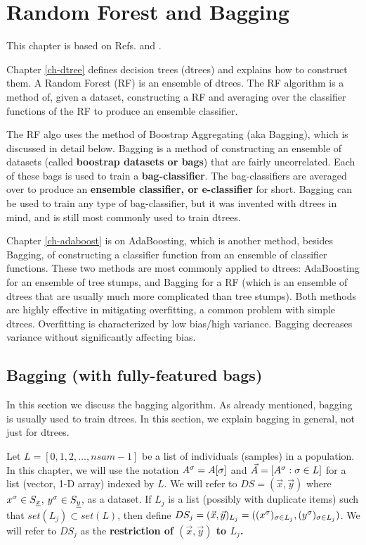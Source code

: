 \chapter{Random Forest and Bagging}
\label{ch-rforest}


This chapter
is based on Refs.\cite{wiki-bagging}
and \cite{wiki-rforest}.

Chapter \ref{ch-dtree}
defines decision trees (dtrees)
and explains how to construct them.
A Random Forest (RF) is 
an ensemble
of dtrees.
The RF algorithm is a
method of,
given a dataset,
constructing a RF
and averaging
over the classifier 
functions of the RF
to produce
an ensemble classifier.


The RF algo
uses  the method of 
Boostrap Aggregating
(aka Bagging), which 
is discussed in detail below.
Bagging
is a method
of constructing
an ensemble
of datasets (called {\bf boostrap
datasets or bags})
that are 
fairly uncorrelated.
Each of
these bags is used to
train a {\bf bag-classifier}.
The bag-classifiers
are averaged over
to produce an {\bf
ensemble classifier,
or e-classifier} for short.
Bagging can be used
to
train any type
of bag-classifier,
but it was 
invented with
dtrees
in mind, 
and is still
 most commonly
used to train dtrees.

Chapter \ref{ch-adaboost}
is on AdaBoosting,
which is 
another method,
besides Bagging,
of constructing a classifier function
from an ensemble 
of classifier functions.
These two methods are most commonly
applied to dtrees: AdaBoosting for an ensemble of
tree stumps, and Bagging for a 
RF (which
is an ensemble
of dtrees that are 
usually much more
complicated than tree stumps).
 Both methods 
 are highly effective
in mitigating overfitting,
a common problem with simple
dtrees.
Overfitting
is characterized by 
low bias/high variance.
Bagging decreases variance
without
significantly
affecting bias.



\section{Bagging (with fully-featured bags)}
In this section
we discuss the bagging
algorithm.
As already 
mentioned,
bagging
is usually
used to train dtrees.
In this
section,
we explain bagging
in general,
not just for dtrees.


Let $L=[0,1,2, \ldots, nsam-1]$ be a list of
individuals (samples) in a population.
In this chapter, we will use the notation 
$A^\sigma=A[\sigma]$ 
and $\vec{A}=[A^\sigma:\sigma\in L]$
for a  list (vector, 1-D  array) indexed by $L$.
We will refer to $DS=(\vec{x}, \vec{y})$ 
where $x^\sigma\in S_{\underline{x}}$, $y^\sigma\in S_{\underline{y}}$,
as a dataset. If
$L_j$ is a list (possibly with 
duplicate items)
such that $set(L_j)\subset set(L)$,
 then
define
$DS_j=(\vec{x}, \vec{y})_{L_j}=
((x^\sigma)_{\sigma\in L_j}, 
(y^\sigma)_{\sigma\in L_j})$.
We will
refer to $DS_j$
as the {\bf restriction of 
$(\vec{x}, \vec{y})$ to $L_j$.}



